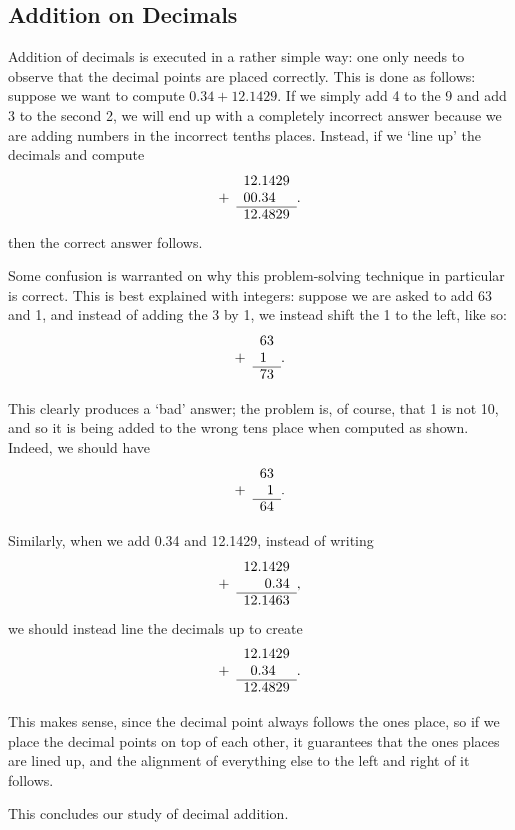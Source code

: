 \documentclass[openany]{book}
\begin{document}
\subsection{Addition on Decimals}
Addition of decimals is executed in a rather simple way: one only needs to observe that the decimal points are placed correctly. This is done as follows: suppose we want to compute $0.34+12.1429$. If we simply add 4 to the 9 and add 3 to the second 2, we will end up with a completely incorrect answer because we are adding numbers in the incorrect tenths places. Instead, if we `line up' the decimals and compute
\[
\begin{array}{@{}cl}
	&12.1429 \\
	+&00.34\\
	\cline{2-2}
	&12.4829
	\end{array}.
\]
then the correct answer follows.\par
Some confusion is warranted on why this problem-solving technique in particular is correct. This is best explained with integers: suppose we are asked to add 63 and 1, and instead of adding the 3 by 1, we instead shift the 1 to the left, like so:
\[
\begin{array}{@{}cl}
	&63\\
	+&1\\
	\cline{2-2}
	&73
\end{array}.
\]\par
This clearly produces a `bad' answer; the problem is, of course, that 1 is not 10, and so it is being added to the wrong tens place when computed as shown. Indeed, we should have
\[
\begin{array}{@{}cr}
	&63 \\
	+&1\\
	\cline{2-2}
	&64
\end{array}.
\]\par
Similarly, when we add 0.34 and 12.1429, instead of writing
\[
\begin{array}{@{}cr}
	&12.1429 \\
	+&0.34\\
	\cline{2-2}
	&12.1463
	\end{array},
\]
we should instead line the decimals up to create
\[
\begin{array}{@{}cl}
	&12.1429 \\
	+&\;\:0.34\\
	\cline{2-2}
	&12.4829
	\end{array}.
\]\par
This makes sense, since the decimal point always follows the ones place, so if we place the decimal points on top of each other, it guarantees that the ones places are lined up, and the alignment of everything else to the left and right of it follows.\par
This concludes our study of decimal addition.
\end{document}
